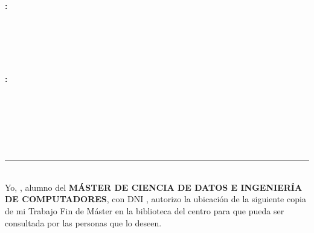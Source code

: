 \chapter*{}


\thispagestyle{empty}

\begin{center}
{\large\bfseries \tituloTFM: \subtituloTFM}\\
\end{center}
\begin{center}
\estudiante\\
\end{center}

\\

\vspace{0.7cm}
\\



\cleardoublepage


\thispagestyle{empty}


\begin{center}
{\large\bfseries \titleMT: \subtitleMT}\\
\end{center}
\begin{center}
\estudiante\\
\end{center}

\\

\vspace{0.7cm}
\\



\chapter*{}
\thispagestyle{empty}

\noindent\rule[-1ex]{\textwidth}{2pt}\\[4.5ex]

Yo, \textbf{\estudiante}, alumno del \textbf{MÁSTER DE CIENCIA DE DATOS E INGENIERÍA DE COMPUTADORES}, con DNI \textbf{\dni}, autorizo la ubicación de la siguiente copia de mi Trabajo Fin de Máster en la biblioteca del centro para que pueda ser consultada por las personas que lo deseen.

